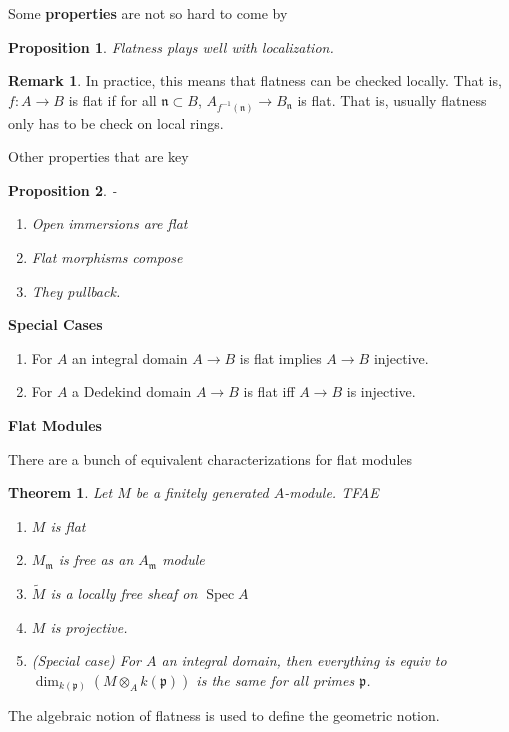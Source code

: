 \documentclass[english]{amsart}
\newcommand{\Spec}{\operatorname{Spec}}
\newcommand{\mf}{\mathfrak}
\newtheorem*{thm}{Theorem}
\newtheorem*{prop}{Proposition}
\theoremstyle{definition}
\newtheorem*{rmk}{Remark}
\begin{document}
Some \textbf{properties} are not so hard to come by 
\begin{prop}
Flatness plays well with localization. 
\end{prop}

\begin{rmk}
In practice, this means that flatness can be checked locally. That is, $f: A\to B$ is flat if for all $\mf{n} \subset B$, $A_{f^{-1}(\mf{n})} \to B_{\mf{n}}$ is flat. That is, usually flatness only has to be check on local rings. 
\end{rmk}

Other properties that are key

\begin{prop}-
\begin{enumerate}
\item Open immersions are flat
\item Flat morphisms compose
\item They pullback. 
\end{enumerate}
\end{prop}


\textbf{Special Cases}

\begin{enumerate}
\item For $A$ an integral domain $A \to B$ is flat implies $A \to B$ injective. 
\item For $A$ a Dedekind domain $A \to B$ is flat iff $A \to B$ is injective. 
\end{enumerate}


\textbf{Flat Modules}

There are a bunch of equivalent characterizations for flat modules

\begin{thm}
Let $M$ be a finitely generated $A$-module. TFAE
\begin{enumerate}
\item $M$ is flat
\item $M_{\mf{m}}$ is free as an $A_{\mf{m}}$ module
\item $\widetilde{M}$ is a locally free sheaf on $\Spec A$
\item $M$ is projective. 
\item (Special case) For $A$ an integral domain, then everything is equiv to $\dim_{k(\mf{p})} (M\otimes_A k(\mf{p}))$ is the same for all primes $\mf{p}$. 
\end{enumerate}
\end{thm}

The algebraic notion of flatness is used to define the geometric notion. 
\end{document}
